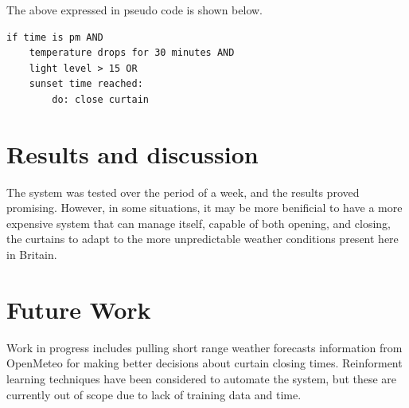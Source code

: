 \documentclass[a4paper,12pt]{article}
\begin{document}
The above expressed in pseudo code is shown below.

\begin{verbatim}
if time is pm AND 
    temperature drops for 30 minutes AND 
    light level > 15 OR 
    sunset time reached:
        do: close curtain
\end{verbatim}

\section{Results and discussion}

The system was tested over the period of a week, and the results proved promising. 
However, in some situations, it may be more benificial to have a more expensive system that can manage itself, capable of both opening, and closing, 
the curtains to adapt to the more unpredictable weather conditions present here in Britain.


\section{Future Work}

Work in progress includes pulling short range weather forecasts information from OpenMeteo\cite{url:openmeteo} for making better decisions 
about curtain closing times.
Reinforment learning techniques have been considered to automate the system, but these are currently out of scope due to lack of training 
data and time.
\end{document}
